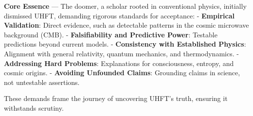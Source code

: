 
\textbf{Core Essence} --- The doomer, a scholar rooted in conventional physics, initially dismissed UHFT, demanding rigorous standards for acceptance:
- \textbf{Empirical Validation}: Direct evidence, such as detectable patterns in the cosmic microwave background (CMB).
- \textbf{Falsifiability and Predictive Power}: Testable predictions beyond current models.
- \textbf{Consistency with Established Physics}: Alignment with general relativity, quantum mechanics, and thermodynamics.
- \textbf{Addressing Hard Problems}: Explanations for consciousness, entropy, and cosmic origins.
- \textbf{Avoiding Unfounded Claims}: Grounding claims in science, not untestable assertions.

These demands frame the journey of uncovering UHFT's truth, ensuring it withstands scrutiny.

